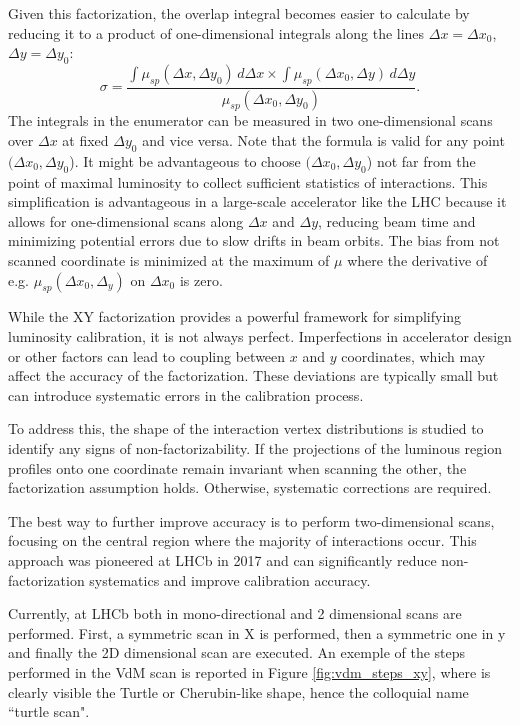 Given this factorization, the overlap integral becomes easier to calculate by reducing it to a product of one-dimensional integrals  along the lines $\Delta x = \Delta x_0$, $\Delta y = \Delta y_0$:
\begin{equation}
\sigma = \frac{\int \mu _{sp}(\Delta x, \Delta y_0)\, d\Delta x \times \int \mu _{sp}(\Delta x_0, \Delta y)\, d\Delta y}{\mu _{sp}(\Delta x_0, \Delta y_0)}.\label{definition_sigma_vdm}
\end{equation}
The integrals in the enumerator can be measured in two one-dimensional scans over $\Delta x$ at fixed $\Delta y_0$ and vice versa. Note that the formula is valid for any point $(\Delta x_0, \Delta y_0$). It might be advantageous to choose $(\Delta x_0, \Delta y_0$) not far from the point of maximal luminosity to collect sufficient statistics of interactions. This simplification is advantageous in a large-scale accelerator like the LHC because it allows for one-dimensional scans along \(\Delta x\) and \(\Delta y\), reducing beam time and minimizing potential errors due to slow drifts in beam orbits. The bias from not scanned coordinate is minimized at the maximum of $\mu$ where the derivative of e.g. $\mu_{sp}(\Delta x_0, \Delta_y)$ on $\Delta x_0$ is zero.

While the XY factorization provides a powerful framework for simplifying luminosity calibration, it is not always perfect. Imperfections in accelerator design or other factors can lead to coupling between \(x\) and \(y\) coordinates, which may affect the accuracy of the factorization. These deviations are typically small but can introduce systematic errors in the calibration process.

To address this, the shape of the interaction vertex distributions is studied to identify any signs of non-factorizability. If the projections of the luminous region profiles onto one coordinate remain invariant when scanning the other, the factorization assumption holds. Otherwise, systematic corrections are required.

\sloppy The best way to further improve accuracy is to perform two-dimensional scans, focusing on the central region where the majority of interactions occur. This approach was pioneered at LHCb in 2017 and can significantly reduce non-factorization systematics and improve calibration accuracy\cite{Balagura_2021}.

Currently, at LHCb both in mono-directional and 2 dimensional scans are performed. First, a symmetric scan in X is performed, then a symmetric one in y and finally the 2D dimensional scan are executed. An exemple of the steps performed in the VdM scan is reported in Figure \ref{fig:vdm_steps_xy}, where is clearly visible the Turtle or Cherubin-like shape, hence the colloquial name ``turtle scan".

